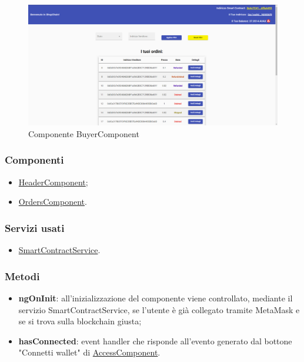 \begin{figure}[!h] 
    \centering 
    \includegraphics[width=1\columnwidth]{immagini/maschere/homepage.png} 
    \caption{Componente BuyerComponent}
\end{figure}

\subsubsection{Componenti}
\begin{itemize}
    \item \hyperref[sec:header-component]{HeaderComponent};
    \item \hyperref[sec:orders-component]{OrdersComponent}.
\end{itemize}

\subsubsection{Servizi usati}
\begin{itemize}
    \item \hyperref[sec:smart-contract-service]{SmartContractService}.
\end{itemize}

\newpage

\subsubsection{Metodi}
\begin{itemize}
    \item \textbf{ngOnInit}: all’inizializzazione del componente viene controllato, mediante il servizio SmartContractService, se l'utente è già collegato tramite MetaMask e se si trova sulla blockchain giusta;
    \item \textbf{hasConnected}: event handler che risponde all'evento generato dal bottone "Connetti wallet" di \hyperref[sec:access-component]{AccessComponent}.
\end{itemize}


